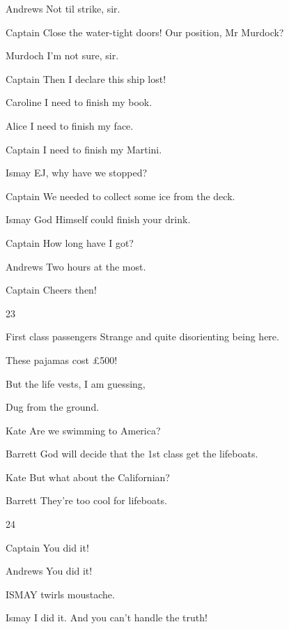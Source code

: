 \documentclass{screenplay}
\newcommand{\andrews}[1]{\begin{dialogue}{Andrews}#1\end{dialogue}}
\newcommand{\alice}[1]{\begin{dialogue}{Alice}#1\end{dialogue}}
\newcommand{\barrett}[1]{\begin{dialogue}{Barrett}#1\end{dialogue}}
\newcommand{\captain}[1]{\begin{dialogue}{Captain}#1\end{dialogue}}
\newcommand{\caroline}[1]{\begin{dialogue}{Caroline}#1\end{dialogue}}
\newcommand{\ismay}[1]{\begin{dialogue}{Ismay}#1\end{dialogue}}
\newcommand{\kate}[1]{\begin{dialogue}{Kate}#1\end{dialogue}}
\newcommand{\murdoch}[1]{\begin{dialogue}{Murdoch}#1\end{dialogue}}
\newcommand{\first}[1]{\begin{dialogue}{First class passengers}#1\end{dialogue}}
\begin{document}
\andrews{
    Not til strike, sir.
}

\captain{
    Close the water-tight doors!
    Our position, Mr Murdock?
}

\murdoch{
    I'm not sure, sir.
}

\captain{
    Then I declare this ship lost!
}


\caroline{
    I need to finish my book.
}

\alice{
    I need to finish my face.
}


\captain{
    I need to finish my Martini.
}

\ismay{
    EJ, why have we stopped?
}

\captain{
    We needed to collect some ice from the deck.
}

\ismay{
    God Himself could finish your drink.
}

\captain{
    How long have I got?
}

\andrews{
    Two hours at the most.
}

\captain{
    Cheers then!
}


23

\first{
    Strange and quite disorienting being here.

    These pajamas cost \pounds 500!

    But the life vests, I am guessing,
    
    Dug from the ground.
}


\kate{
    Are we swimming to America?
}

\barrett{
    God will decide that the 1st class get the lifeboats.
}

\kate{
    But what about the Californian?
}

\barrett{
    They're too cool for lifeboats.
}


24

\captain{
    You did it!
}

\andrews{
    You did it!
}

ISMAY twirls moustache.

\ismay{
    I did it.  And you can't handle the truth!
}

\end{document}

